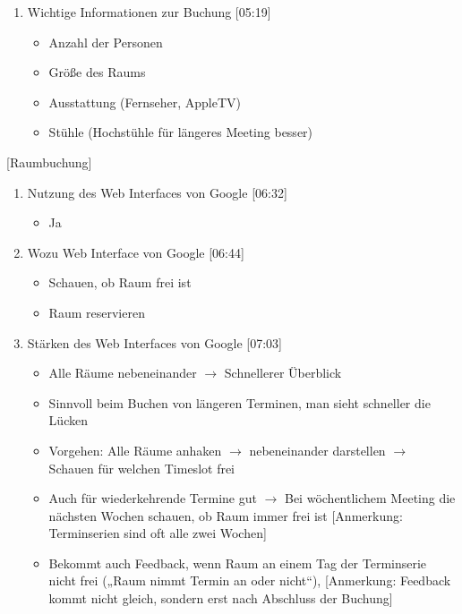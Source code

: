 \begin{enumerate}
    \item Wichtige Informationen zur Buchung [05:19]
    \begin{itemize}
        \item Anzahl der Personen
        \item Größe des Raums
        \item Ausstattung (Fernseher, AppleTV)
        \item Stühle (Hochstühle für längeres Meeting besser)
    \end{itemize}

\end{enumerate}

[Raumbuchung]

\begin{enumerate}

    \item Nutzung des Web Interfaces von Google [06:32]
    \begin{itemize}
        \item Ja
    \end{itemize}
    
    \item Wozu Web Interface von Google [06:44]
    \begin{itemize}
        \item Schauen, ob Raum frei ist
        \item Raum reservieren
    \end{itemize}
    
    \item Stärken des Web Interfaces von Google [07:03]
    \begin{itemize}
        \item Alle Räume nebeneinander $\rightarrow$ Schnellerer Überblick
        \item Sinnvoll beim Buchen von längeren Terminen, man sieht schneller die Lücken
        \item Vorgehen: Alle Räume anhaken $\rightarrow$ nebeneinander darstellen $\rightarrow$ Schauen für welchen Timeslot frei
        \item Auch für wiederkehrende Termine gut $\rightarrow$ Bei wöchentlichem Meeting die nächsten Wochen schauen, ob Raum immer frei ist [Anmerkung: Terminserien sind oft alle zwei Wochen]
        \item Bekommt auch Feedback, wenn Raum an einem Tag der Terminserie nicht frei („Raum nimmt Termin an oder nicht“), [Anmerkung: Feedback kommt nicht gleich, sondern erst nach Abschluss der Buchung]
    \end{itemize}
    

\end{enumerate}
